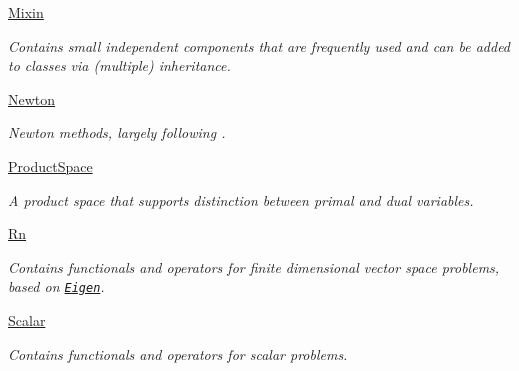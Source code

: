 \begin{DoxyCompactItemize}
 \hyperlink{namespaceSpacy_1_1Mixin}{Mixin}
\begin{DoxyCompactList}\small\item\em Contains small independent components that are frequently used and can be added to classes via (multiple) inheritance. \end{DoxyCompactList}\item 
 \hyperlink{namespaceSpacy_1_1Newton}{Newton}
\begin{DoxyCompactList}\small\item\em Newton methods, largely following \cite{Deuflhard2004}. \end{DoxyCompactList}\item 
 \hyperlink{namespaceSpacy_1_1ProductSpace}{Product\+Space}
\begin{DoxyCompactList}\small\item\em A product space that supports distinction between primal and dual variables. \end{DoxyCompactList}\item 
 \hyperlink{namespaceSpacy_1_1Rn}{Rn}
\begin{DoxyCompactList}\small\item\em Contains functionals and operators for finite dimensional vector space problems, based on \href{http://eigen.tuxfamily.org}{\tt Eigen}. \end{DoxyCompactList}\item 
 \hyperlink{namespaceSpacy_1_1Scalar}{Scalar}
\begin{DoxyCompactList}\small\item\em Contains functionals and operators for scalar problems. \end{DoxyCompactList}\end{DoxyCompactItemize}
